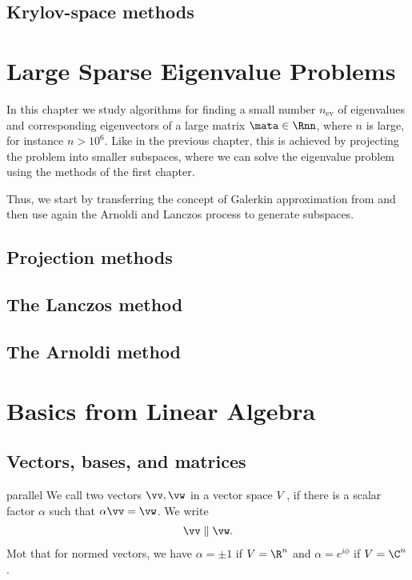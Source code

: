 \section{Krylov-space methods}


\chapter{Large Sparse Eigenvalue Problems}
\label{chap:sparse-eigen}

\begin{intro}
  In this chapter we study algorithms for finding a small number
  $n_{\text{ev}}$ of eigenvalues and corresponding eigenvectors of a
  large matrix $\mata\in\Rnn$, where $n$ is large, for instance
  $n>10^6$. Like in the previous chapter, this is achieved by
  projecting the problem into smaller subspaces, where we can solve
  the eigenvalue problem using the methods of the first chapter.

  Thus, we start by transferring the concept of Galerkin approximation
  from  and then use again the
  Arnoldi and Lanczos process to generate subspaces.
\end{intro}

\section{Projection methods}


\section{The Lanczos method}


\section{The Arnoldi method}



\appendix
\chapter{Basics from Linear Algebra}
\section{Vectors, bases, and matrices}

\begin{Definition}{parallel}
  We call two vectors $\vv,\vw$ in a vector space $V$ , if
  there is a scalar factor $\alpha$ such that $\alpha \vv=\vw$. We write
  \begin{gather}
    \vv\parallel\vw.
  \end{gather}
  Mot that for normed vectors, we have $\alpha = \pm1$ if $V=\R^n$ and
  $\alpha = e^{i\phi}$ if $V=\C^n$.
\end{Definition}


